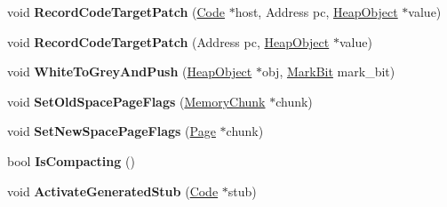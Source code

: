 \begin{DoxyCompactItemize}
\item 
void {\bfseries Record\+Code\+Target\+Patch} (\hyperlink{classv8_1_1internal_1_1_code}{Code} $\ast$host, Address pc, \hyperlink{classv8_1_1internal_1_1_heap_object}{Heap\+Object} $\ast$value)\hypertarget{classv8_1_1internal_1_1_incremental_marking_a5b13c86c7e3c9efec46f89cba0beb8b2}{}\label{classv8_1_1internal_1_1_incremental_marking_a5b13c86c7e3c9efec46f89cba0beb8b2}

\item 
void {\bfseries Record\+Code\+Target\+Patch} (Address pc, \hyperlink{classv8_1_1internal_1_1_heap_object}{Heap\+Object} $\ast$value)\hypertarget{classv8_1_1internal_1_1_incremental_marking_a4ae4a04f63689971d748468493dfcc10}{}\label{classv8_1_1internal_1_1_incremental_marking_a4ae4a04f63689971d748468493dfcc10}

\item 
void {\bfseries White\+To\+Grey\+And\+Push} (\hyperlink{classv8_1_1internal_1_1_heap_object}{Heap\+Object} $\ast$obj, \hyperlink{classv8_1_1internal_1_1_mark_bit}{Mark\+Bit} mark\+\_\+bit)\hypertarget{classv8_1_1internal_1_1_incremental_marking_a1ce05ca6a669f73722b1a158caa4e512}{}\label{classv8_1_1internal_1_1_incremental_marking_a1ce05ca6a669f73722b1a158caa4e512}

\item 
void {\bfseries Set\+Old\+Space\+Page\+Flags} (\hyperlink{classv8_1_1internal_1_1_memory_chunk}{Memory\+Chunk} $\ast$chunk)\hypertarget{classv8_1_1internal_1_1_incremental_marking_a4851b978876697b1d5973777860ebb34}{}\label{classv8_1_1internal_1_1_incremental_marking_a4851b978876697b1d5973777860ebb34}

\item 
void {\bfseries Set\+New\+Space\+Page\+Flags} (\hyperlink{classv8_1_1internal_1_1_page}{Page} $\ast$chunk)\hypertarget{classv8_1_1internal_1_1_incremental_marking_a66793955f8c2587afe1bc166aeab98a0}{}\label{classv8_1_1internal_1_1_incremental_marking_a66793955f8c2587afe1bc166aeab98a0}

\item 
bool {\bfseries Is\+Compacting} ()\hypertarget{classv8_1_1internal_1_1_incremental_marking_a32ca339c9ec48cb21a0b885c9a0c2721}{}\label{classv8_1_1internal_1_1_incremental_marking_a32ca339c9ec48cb21a0b885c9a0c2721}

\item 
void {\bfseries Activate\+Generated\+Stub} (\hyperlink{classv8_1_1internal_1_1_code}{Code} $\ast$stub)\hypertarget{classv8_1_1internal_1_1_incremental_marking_ae93f56841f4c0035cc6f37811c76f6e0}{}\label{classv8_1_1internal_1_1_incremental_marking_ae93f56841f4c0035cc6f37811c76f6e0}


\end{DoxyCompactItemize}
